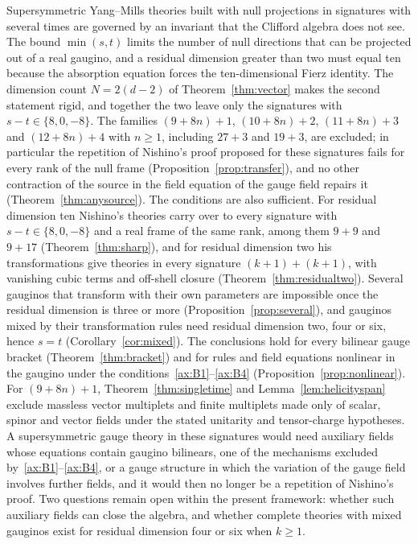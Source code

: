 Supersymmetric Yang--Mills theories built with null projections in signatures with several times are governed by an invariant that the Clifford algebra does not see. The bound $\min(s,t)$ limits the number of null directions that can be projected out of a real gaugino, and a residual dimension greater than two must equal ten because the absorption equation forces the ten-dimensional Fierz identity. The dimension count $N=2(d-2)$ of Theorem~\ref{thm:vector} makes the second statement rigid, and together the two leave only the signatures with $s-t\in\{8,0,-8\}$. The families $(9+8n)+1$, $(10+8n)+2$, $(11+8n)+3$ and $(12+8n)+4$ with $n\ge1$, including $27+3$ and $19+3$, are excluded; in particular the repetition of Nishino's proof proposed for these signatures fails for every rank of the null frame (Proposition~\ref{prop:transfer}), and no other contraction of the source in the field equation of the gauge field repairs it (Theorem~\ref{thm:anysource}). The conditions are also sufficient. For residual dimension ten Nishino's theories carry over to every signature with $s-t\in\{8,0,-8\}$ and a real frame of the same rank, among them $9+9$ and $9+17$ (Theorem~\ref{thm:sharp}), and for residual dimension two his transformations give theories in every signature $(k+1)+(k+1)$, with vanishing cubic terms and off-shell closure (Theorem~\ref{thm:residualtwo}). Several gauginos that transform with their own parameters are impossible once the residual dimension is three or more (Proposition~\ref{prop:several}), and gauginos mixed by their transformation rules need residual dimension two, four or six, hence $s=t$ (Corollary~\ref{cor:mixed}). The conclusions hold for every bilinear gauge bracket (Theorem~\ref{thm:bracket}) and for rules and field equations nonlinear in the gaugino under the conditions~\ref{ax:B1}--\ref{ax:B4} (Proposition~\ref{prop:nonlinear}). For $(9+8n)+1$, Theorem~\ref{thm:singletime} and Lemma~\ref{lem:helicityspan} exclude massless vector multiplets and finite multiplets made only of scalar, spinor and vector fields under the stated unitarity and tensor-charge hypotheses. A supersymmetric gauge theory in these signatures would need auxiliary fields whose equations contain gaugino bilinears, one of the mechanisms excluded by~\ref{ax:B1}--\ref{ax:B4}, or a gauge structure in which the variation of the gauge field involves further fields, and it would then no longer be a repetition of Nishino's proof. Two questions remain open within the present framework: whether such auxiliary fields can close the algebra, and whether complete theories with mixed gauginos exist for residual dimension four or six when $k\ge1$.

